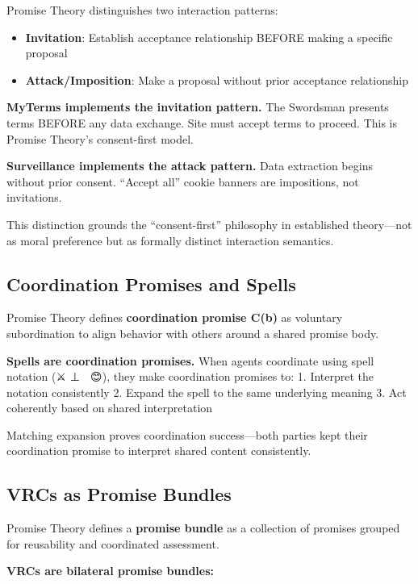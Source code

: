 \documentclass[
  11pt,
]{article}
\providecommand{\tightlist}{%
  \setlength{\itemsep}{0pt}\setlength{\parskip}{0pt}}
\begin{document}
Promise Theory distinguishes two interaction patterns:

\begin{itemize}
\tightlist
\item
  \textbf{Invitation}: Establish acceptance relationship BEFORE making a
  specific proposal
\item
  \textbf{Attack/Imposition}: Make a proposal without prior acceptance
  relationship
\end{itemize}

\textbf{MyTerms implements the invitation pattern.} The Swordsman
presents terms BEFORE any data exchange. Site must accept terms to
proceed. This is Promise Theory's consent-first model.

\textbf{Surveillance implements the attack pattern.} Data extraction
begins without prior consent. ``Accept all'' cookie banners are
impositions, not invitations.

This distinction grounds the ``consent-first'' philosophy in established
theory---not as moral preference but as formally distinct interaction
semantics.

\subsection{Coordination Promises and
Spells}\label{coordination-promises-and-spells}

Promise Theory defines \textbf{coordination promise C(b)} as voluntary
subordination to align behavior with others around a shared promise
body.

\textbf{Spells are coordination promises.} When agents coordinate using
spell notation (⚔️ ⊥ 🧙 \textbar{} 😊), they make coordination promises
to: 1. Interpret the notation consistently 2. Expand the spell to the
same underlying meaning 3. Act coherently based on shared interpretation

Matching expansion proves coordination success---both parties kept their
coordination promise to interpret shared content consistently.

\subsection{VRCs as Promise Bundles}\label{vrcs-as-promise-bundles}

Promise Theory defines a \textbf{promise bundle} as a collection of
promises grouped for reusability and coordinated assessment.

\textbf{VRCs are bilateral promise bundles:}
\end{document}
